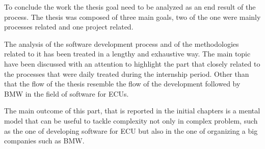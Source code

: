 \documentclass[../main.tex]{subfiles}
\begin{document}
To conclude the work the thesis goal need to be analyzed as an end result of the process. The thesis was composed of three main goals, two of the one were mainly processes related and one project related. 

The analysis of the software development process and of the methodologies related to it has been treated in a lengthy and exhaustive way. The main topic have been discussed with an attention to highlight the part that closely related to the processes that were daily treated during the internship period. Other than that the flow of the thesis resemble the flow of the development followed by \gls{BMW} in the field of software for \gls{ECU}s. 

The main outcome of this part, that is reported in the initial chapters is a mental model that can be useful to tackle complexity not only in complex problem, such as the one of developing software for \gls{ECU} but also in the one of organizing a big companies such as \gls{BMW}.
\end{document}

